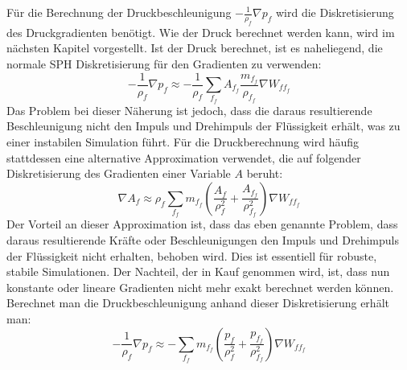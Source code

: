 \documentclass{scrreprt}
\begin{document}
Für die Berechnung der Druckbeschleunigung $-\frac{1}{\rho_f} \nabla p_f$ wird die Diskretisierung des Druckgradienten benötigt.
Wie der Druck berechnet werden kann, wird im nächsten Kapitel vorgestellt.
Ist der Druck berechnet, ist es naheliegend, die normale SPH Diskretisierung für den Gradienten zu verwenden:
\begin{equation}
    -\frac{1}{\rho_f} \nabla p_f \approx -\frac{1}{\rho_f} \sum_{f_f} A_{f_f} \frac{m_{f_f}}{\rho_{f_f}} \nabla W_{ff_f}
\end{equation}
Das Problem bei dieser Näherung ist jedoch, dass die daraus resultierende Beschleunigung nicht den Impuls und Drehimpuls der Flüssigkeit erhält,
was zu einer instabilen Simulation führt.
Für die Druckberechnung wird häufig stattdessen eine alternative Approximation verwendet,
die auf folgender Diskretisierung des Gradienten einer Variable $A$ beruht:
\begin{equation}
    \nabla A_f \approx \rho_f \sum_{f_f} m_{f_f} \left( \frac{A_f}{\rho_f^2} + \frac{A_{f_f}}{\rho_{f_f}^2} \right) \nabla W_{ff_f}
\end{equation}
Der Vorteil an dieser Approximation ist, dass das eben genannte Problem,
dass daraus resultierende Kräfte oder Beschleunigungen den Impuls und Drehimpuls der Flüssigkeit nicht erhalten, behoben wird.
Dies ist essentiell für robuste, stabile Simulationen.
Der Nachteil, der in Kauf genommen wird, ist, dass nun konstante oder lineare Gradienten nicht mehr exakt berechnet werden können.
Berechnet man die Druckbeschleunigung anhand dieser Diskretisierung erhält man:
\begin{equation}
    -\frac{1}{\rho_f} \nabla p_f \approx -\sum_{f_f} m_{f_f} \left( \frac{p_f}{\rho_f^2} + \frac{p_{f_f}}{\rho_{f_f}^2} \right) \nabla W_{ff_f}
\end{equation}
\end{document}
